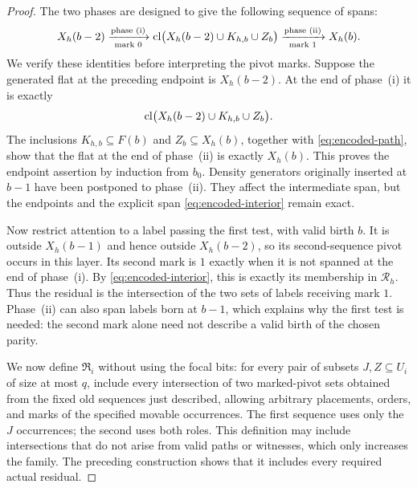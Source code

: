 \begin{proof}
The two phases are designed to give the following sequence of spans:
\[
 X_h(b-2)
 \xrightarrow[\text{mark }0]{\text{phase (i)}}
 \operatorname{cl}\bigl(X_h(b-2)\cup K_{h,b}\cup Z_b\bigr)
 \xrightarrow[\text{mark }1]{\text{phase (ii)}}
 X_h(b).
\]
We verify these identities before interpreting the pivot marks.
Suppose the generated flat at the preceding endpoint is $X_h(b-2)$.
At the end of phase~\textnormal{(i)} it is exactly
\begin{equation}\label{eq:encoded-interior}
 \operatorname{cl}\bigl(X_h(b-2)\cup K_{h,b}\cup Z_b\bigr).
\end{equation}
The inclusions $K_{h,b}\subseteq F(b)$ and $Z_b\subseteq X_h(b)$,
together with \eqref{eq:encoded-path}, show that the flat at the end
of phase~\textnormal{(ii)} is exactly $X_h(b)$.  This proves the
endpoint assertion by induction from $b_0$.
Density generators originally inserted at $b-1$ have been postponed
to phase~\textnormal{(ii)}.  They affect the intermediate span, but
the endpoints and the explicit span \eqref{eq:encoded-interior}
remain exact.

Now restrict attention to a label passing the first test, with valid
birth $b$.  It is outside $X_h(b-1)$ and hence outside $X_h(b-2)$,
so its second-sequence pivot occurs in this layer.  Its second mark is
$1$ exactly when it is not spanned at the end of phase~\textnormal{(i)}.
By \eqref{eq:encoded-interior}, this is exactly its membership in
$\mathcal R_h$.  Thus the residual is the intersection of the two
sets of labels receiving mark $1$.  Phase~\textnormal{(ii)} can also
span labels born at $b-1$, which explains why the first test is needed:
the second mark alone need not describe a valid birth of the chosen
parity.

We now define $\mathfrak R_i$ without using the focal bits: for every
pair of subsets $J,Z\subseteq U_i$ of size at most $q$, include every
intersection of two marked-pivot sets obtained from the fixed old
sequences just described, allowing arbitrary placements, orders, and
marks of the specified movable occurrences.  The first sequence uses
only the $J$ occurrences; the second uses both roles.  This definition
may include intersections that do not arise from valid paths or
witnesses, which only increases the family.  The preceding construction
shows that it includes every required actual residual.


\end{proof}
